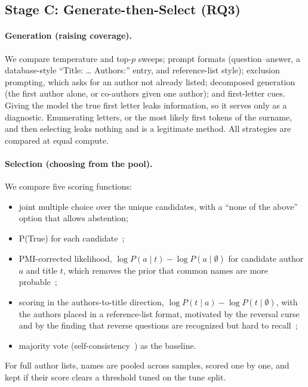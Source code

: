\documentclass[sigconf,nonacm]{acmart}
\begin{document}
\subsection{Stage C: Generate-then-Select (RQ3)}

\paragraph{Generation (raising coverage).}
We compare temperature and top-$p$ sweeps; prompt formats (question--answer, a database-style ``Title: \ldots{} Authors:'' entry, and reference-list style); exclusion prompting, which asks for an author not already listed; decomposed generation (the first author alone, or co-authors given one author); and first-letter cues. Giving the model the true first letter leaks information, so it serves only as a diagnostic. Enumerating letters, or the most likely first tokens of the surname, and then selecting leaks nothing and is a legitimate method. All strategies are compared at equal compute.

\paragraph{Selection (choosing from the pool).}
We compare five scoring functions:
\begin{itemize}
\item joint multiple choice over the unique candidates, with a ``none of the above'' option that allows abstention;
\item P(True) for each candidate~\cite{kadavath2022language};
\item PMI-corrected likelihood, $\log P(a \mid t) - \log P(a \mid \emptyset)$ for candidate author $a$ and title $t$, which removes the prior that common names are more probable~\cite{holtzman2021surface};
\item scoring in the authors-to-title direction, $\log P(t \mid a) - \log P(t \mid \emptyset)$, with the authors placed in a reference-list format, motivated by the reversal curse~\cite{berglund2024reversal} and by the finding that reverse questions are recognized but hard to recall~\cite{calderon2026emptyshelves};
\item majority vote (self-consistency~\cite{wang2023selfconsistency}) as the baseline.
\end{itemize}
For full author lists, names are pooled across samples, scored one by one, and kept if their score clears a threshold tuned on the tune split.
\end{document}
